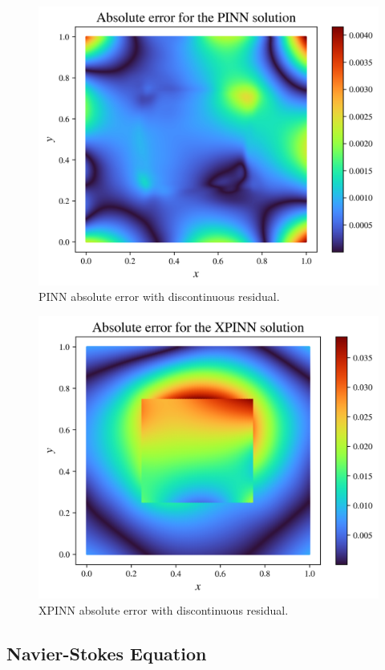\begin{figure}[h]
    \centering
    \includegraphics[width=0.7\linewidth]{Project1XPINNs/figures/Poisson/discrete_single_Poisson_error.pdf.png}
    \caption{PINN absolute error with discontinuous residual.}
    \label{fig:pinn_disc_error}
\end{figure}

\begin{figure}[h]
    \centering
    \includegraphics[width=0.7\linewidth]{Project1XPINNs/figures/Poisson/discrete_xpinn_Poisson_error.png}
    \caption{XPINN absolute error with discontinuous residual.}
    \label{fig:xpinn_disc_error}
\end{figure}


\subsection{Navier-Stokes Equation}
